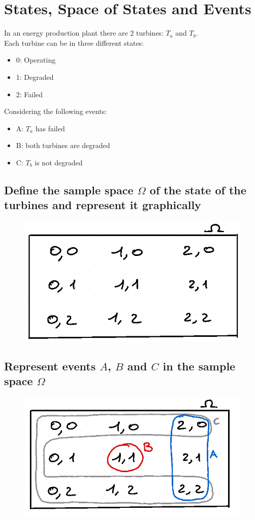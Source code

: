 \documentclass{article}
\newcommand{\mysection}[2]{\setcounter{section}{#1}\addtocounter{section}{-1}\section{#2}}
\begin{document}
\newpage
{}
\mysection{0}{States, Space of States and Events}
In an energy production plant there are 2 turbines: $T_a$ and $T_b$. \\
Each turbine can be in three different states:
\begin{itemize}
    \item 0: Operating
    \item 1: Degraded
    \item 2: Failed
\end{itemize}
Considering the following events:
\begin{itemize}
    \item A: $T_a$ has failed
    \item B: both turbines are degraded
    \item C: $T_b$ is not degraded
\end{itemize}
\subsection{Define the sample space $\Omega$ of the state of the turbines and represent it graphically}
\begin{figure}[h]
    \centering
    \includegraphics[width=0.5\linewidth]{image.png}

\end{figure}
\subsection{Represent events $A$, $B$ and $C$ in the sample space $\Omega$}
\begin{figure}[h]
    \centering
    \includegraphics[width=0.5\linewidth]{image2.png}
    
    
\end{figure}
\end{document}

